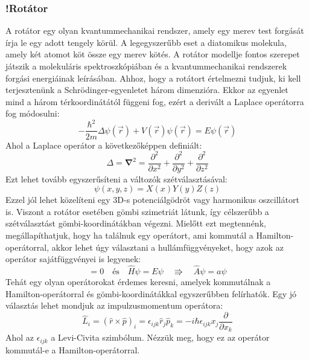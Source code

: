 \documentclass[a4paper,12pt]{article}
\begin{document}
\subsubsection{!Rotátor}
A rotátor egy olyan kvantummechanikai rendszer, amely egy merev test forgását írja le egy adott tengely körül. A legegyszerűbb eset a diatomikus molekula, amely két atomot köt össze egy merev kötés. A rotátor modellje fontos szerepet játszik a molekuláris spektroszkópiában és a kvantummechanikai rendszerek forgási energiáinak leírásában.
Ahhoz, hogy a rotátort értelmezni tudjuk, ki kell terjesztenünk a Schrödinger-egyenletet három dimenzióra. Ekkor az egyenlet mind a három térkoordinátától függeni fog, ezért a derivált a Laplace operátorra fog módosulni:
\begin{equation}
    - \frac{\hbar^2}{2m} \Delta \psi(\vec{r}) + V(\vec{r}) \psi(\vec{r}) = E \psi(\vec{r})
\end{equation}
Ahol a Laplace operátor a következőképpen definiált:
\begin{equation}
    \Delta = \boldsymbol{\nabla}^2 = \frac{\partial^2}{\partial x^2} + \frac{\partial^2}{\partial y^2} + \frac{\partial^2}{\partial z^2}
\end{equation}
Ezt lehet tovább egyszerűsíteni a változók szétválasztásával:
\begin{equation}
    \psi(x,y,z) = X(x) Y(y) Z(z)
\end{equation}
Ezzel jól lehet közelíteni egy 3D-s potenciálgödröt vagy harmonikus oszcillátort is. Viszont a rotátor esetében gömbi szimetriát látunk, 
így célszerűbb a szétválasztást gömbi-koordinátákban végezni. Mielőtt ezt megtennénk, megállapíthatjuk, hogy ha találnuk egy operátort, ami
kommutál a Hamilton-operátorral, akkor lehet úgy választani a hullámfüggvényeket, hogy azok az operátor sajátfüggvényei is legyenek:
\begin{equation}
    [\hat{H}, \hat{A}] = 0 \quad \text{és} \quad \hat{H} \psi = E \psi \quad \Rrightarrow \quad \hat{A} \psi = a \psi
\end{equation}
Tehát egy olyan operátorokat érdemes keresni, amelyek kommutálnak a Hamilton-operátorral és gömbi-koordinátákkal egyszerűbben felírhatók.
Egy jó választás lehet mondjuk az impulzusmomentum operátora:
\begin{equation}
    \hat{L}_i = (\hat{r} \times \hat{p})_i = \epsilon_{ijk} \hat{r}_j \hat{p}_k = - i \hbar \epsilon_{ijk} x_j \frac{\partial}{\partial x_k}
\end{equation}
Ahol az $\epsilon_{ijk}$ a Levi-Civita szimbólum. Nézzük meg, hogy ez az operátor kommutál-e a Hamilton-operátorral.
\end{document}
